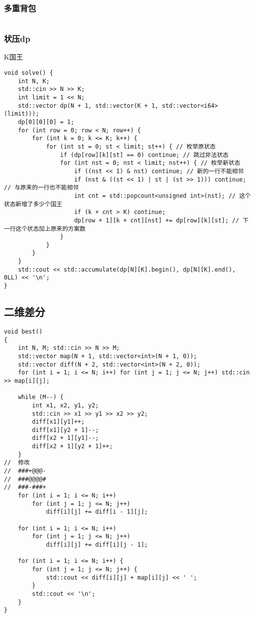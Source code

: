 \documentclass[a4paper, 10pt]{paper}
\newcommand{\cpp}[1]{\inputminted[frame=single, linenos=true]{cpp}{#1}}
\begin{document}
        \subsubsection{多重背包}
        \cpp{../多重背包.cpp}

        \subsubsection{状压dp}
        K国王
        \begin{verbatim}
void solve() {
    int N, K;
    std::cin >> N >> K;
    int limit = 1 << N;
    std::vector dp(N + 1, std::vector(K + 1, std::vector<i64>(limit)));
    dp[0][0][0] = 1;
    for (int row = 0; row < N; row++) {
        for (int k = 0; k <= K; k++) {
            for (int st = 0; st < limit; st++) { // 枚举原状态
                if (dp[row][k][st] == 0) continue; // 跳过非法状态
                for (int nst = 0; nst < limit; nst++) { // 枚举新状态
                    if ((nst << 1) & nst) continue; // 新的一行不能相邻
                    if (nst & ((st << 1) | st | (st >> 1))) continue; // 与原来的一行也不能相邻
                    int cnt = std::popcount<unsigned int>(nst); // 这个状态新增了多少个国王
                    if (k + cnt > K) continue;
                    dp[row + 1][k + cnt][nst] += dp[row][k][st]; // 下一行这个状态加上原来的方案数
                }
            }
        }
    }
    std::cout << std::accumulate(dp[N][K].begin(), dp[N][K].end(), 0LL) << '\n';
}
        \end{verbatim}

        \subsection{二维差分}
        \begin{verbatim}
void best()
{
    int N, M; std::cin >> N >> M;
    std::vector map(N + 1, std::vector<int>(N + 1, 0));
    std::vector diff(N + 2, std::vector<int>(N + 2, 0));
    for (int i = 1; i <= N; i++) for (int j = 1; j <= N; j++) std::cin >> map[i][j];

    while (M--) {
        int x1, x2, y1, y2;
        std::cin >> x1 >> y1 >> x2 >> y2;
        diff[x1][y1]++;
        diff[x1][y2 + 1]--;
        diff[x2 + 1][y1]--;
        diff[x2 + 1][y2 + 1]++;
    }
//  修改
//  ###+@@@-
//  ###@@@@#
//  ###-###+
    for (int i = 1; i <= N; i++)
        for (int j = 1; j <= N; j++)
            diff[i][j] += diff[i - 1][j];

    for (int i = 1; i <= N; i++)
        for (int j = 1; j <= N; j++)
            diff[i][j] += diff[i][j - 1];

    for (int i = 1; i <= N; i++) {
        for (int j = 1; j <= N; j++) {
            std::cout << diff[i][j] + map[i][j] << ' ';
        }
        std::cout << '\n';
    }
}
        \end{verbatim}
\end{document}
